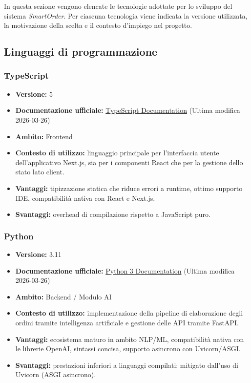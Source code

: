 \documentclass[a4paper, 11pt, oneside]{scrartcl}
\begin{document}
In questa sezione vengono elencate le tecnologie adottate per lo sviluppo del sistema \textit{SmartOrder}. Per ciascuna tecnologia viene indicata la versione utilizzata, la motivazione della scelta e il contesto d'impiego nel progetto.

\subsection{Linguaggi di programmazione}

\subsubsection{TypeScript}
\begin{itemize}[noitemsep]
\item \textbf{Versione:} 5
\item \textbf{Documentazione ufficiale:} \href{https://www.typescriptlang.org/docs/}{TypeScript
 Documentation} (Ultima modifica 2026-03-26)
\item \textbf{Ambito:} Frontend
\item \textbf{Contesto di utilizzo:} linguaggio principale per l'interfaccia utente dell'applicativo Next.js, sia per i componenti React che per la gestione dello stato lato client.
\item \textbf{Vantaggi:} tipizzazione statica che riduce errori a runtime, ottimo supporto IDE, compatibilit\`a nativa con React e Next.js.
\item \textbf{Svantaggi:} overhead di compilazione rispetto a JavaScript puro.
\end{itemize}

\subsubsection{Python}
\begin{itemize}[noitemsep]
\item \textbf{Versione:} 3.11
\item \textbf{Documentazione ufficiale:} \href{https://docs.python.org/3/}{Python 3 Documentation} (Ultima modifica 2026-03-26)
\item \textbf{Ambito:} Backend / Modulo AI
\item \textbf{Contesto di utilizzo:} implementazione della pipeline di elaborazione degli ordini tramite intelligenza artificiale e gestione delle API tramite FastAPI.
\item \textbf{Vantaggi:} ecosistema maturo in ambito NLP/ML, compatibilit\`a nativa con le librerie OpenAI, sintassi concisa, supporto asincrono con Uvicorn/ASGI.
\item \textbf{Svantaggi:} prestazioni inferiori a linguaggi compilati; mitigato dall'uso di Uvicorn (ASGI asincrono).
\end{itemize}
\end{document}
